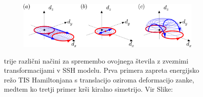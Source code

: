 \begin{figure}[H]
\centering
\begin{subfigure}{.9\textwidth}
\includegraphics[width=\linewidth]{Figures/SymBreak.png}
\end{subfigure}
\caption{trije različni načini za spremembo ovojnega števila z zveznimi transformacijami v SSH modelu. Prva primera zapreta energijsko režo TIS Hamiltonjana s translacijo oziroma deformacijo zanke, medtem ko tretji primer krši kiralno simetrijo. Vir Slike: \cite{madzar}}
\label{fig:symbreak}
\end{figure}


